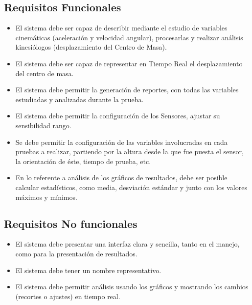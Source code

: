 \documentclass[12pt,a4paper]{article}
\begin{document}
\subsection{Requisitos Funcionales}
\begin{itemize}
	\item El sistema debe ser capaz de describir mediante el estudio de variables cinemáticas (aceleración y velocidad angular), procesarlas y realizar análisis kinesiólogos (desplazamiento del Centro de Masa).
	\item El sistema debe ser capaz de representar en Tiempo Real el desplazamiento del centro de masa.
	\item El sistema debe permitir la generación de reportes, con todas las variables estudiadas y analizadas durante la prueba.
	\item El sistema debe permitir la configuración de los Sensores, ajustar su sensibilidad rango.
	\item Se debe permitir la configuración de las variables involucradas en cada pruebas a realizar, partiendo por la altura desde la que fue puesta el sensor, la orientación de éste, tiempo de prueba, etc.
	\item En lo referente a análisis de los gráficos de resultados, debe ser posible calcular estadísticos, como media, desviación estándar y junto con los valores máximos y mínimos.
\end{itemize} 

\subsection{Requisitos No funcionales}
\begin{itemize}
	\item El sistema debe presentar una interfaz clara y sencilla, tanto en el manejo, como para la presentación de resultados.
	\item El sistema debe tener un nombre representativo.
	\item El sistema debe permitir análisis usando los gráficos y mostrando los cambios (recortes o ajustes) en tiempo real.
\end{itemize}
\end{document}

